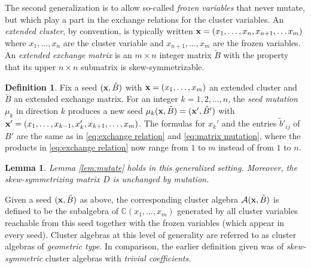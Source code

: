 \documentclass{amsart}
\newtheorem{lemma}[theorem]{Lemma}
\theoremstyle{definition}
\newtheorem{definition}[theorem]{Definition}
\theoremstyle{remark}
\numberwithin{equation}{section}
\newcommand{\cA}{{\mathcal{A}}}
\newcommand{\x}{{\bf x}}
\newcommand{\CC}{{\mathbb{C}}}
\begin{document}
	The second generalization is to allow so-called \emph{frozen variables} that never mutate, but which play a part in the exchange relations for the cluster variables. An \emph{extended cluster}, by convention, is typically written $\x = (x_1,\ldots, x_n, x_{n+1},\ldots x_m)$ where $x_1,\ldots, x_n$ are the cluster variable and $x_{n+1},\ldots, x_m$ are the frozen variables.  An \emph{extended exchange matrix} is an $m \times n$ integer matrix $\tilde{B}$ with the property that its upper $n \times n$ submatrix is skew-symmetrizable.
	
	\begin{definition}
	Fix a seed $(\x, \tilde B)$ with $\x=(x_1,\ldots, x_m)$ an extended cluster and $\tilde{B}$ an extended exchange matrix.  For an integer $k = 1,2,\ldots, n$, the \emph{seed mutation} $\mu_k$ in direction $k$ produces a new seed $\mu_k(\x,\tilde{B}) = (\x',\tilde{B}')$ with $\x' = (x_1,\ldots, x_{k-1}, x_k', x_{k+1},\ldots, x_m)$.  The formulas for $x_k'$ and the entries $\tilde{b}'_{ij}$ of $B'$ are the same as in \eqref{eq:exchange relation} and \eqref{eq:matrix mutation}, where the products in \eqref{eq:exchange relation} now range from $1$ to $m$ instead of from $1$ to $n$.
	\end{definition}
	
	\begin{lemma}
	Lemma \ref{lem:mutate} holds in this generalized setting.  Moreover, the skew-symmetrizing matrix $D$ is unchanged by mutation.
	\end{lemma}
	
	Given a seed $(\x, \tilde{B})$ as above, the corresponding cluster algebra $\cA(\x, \tilde{B})$ is defined to be the subalgebra of $\CC(x_1,\ldots, x_m)$ generated by all cluster variables reachable from this seed together with the frozen variables (which appear in every seed).  Cluster algebras at this level of generality are referred to as cluster algebras of \emph{geometric type}.  In comparison, the earlier definition given was of \emph{skew-symmetric} cluster algebras with \emph{trivial coefficients}.
	
\end{document}

